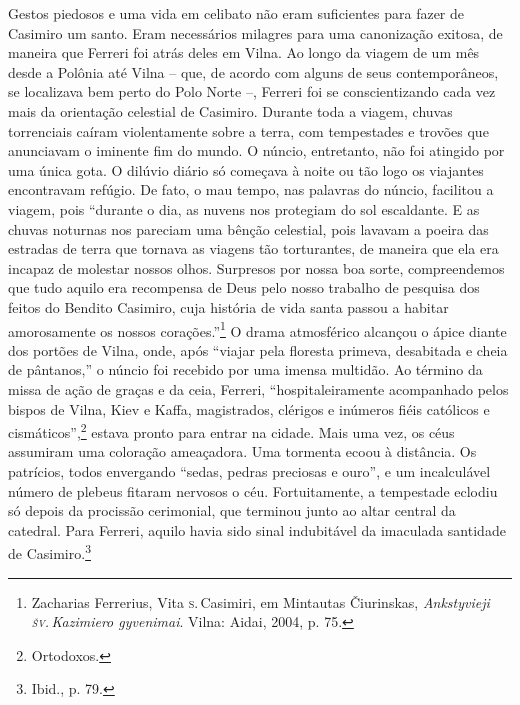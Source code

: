 Gestos piedosos e uma vida em celibato não eram suficientes para fazer
de Casimiro um santo. Eram necessários milagres para uma canonização
exitosa, de maneira que Ferreri foi atrás deles em Vilna. Ao longo da 
viagem de um mês desde a Polônia até Vilna -- que, de acordo com
alguns de seus contemporâneos, se localizava bem perto do Polo Norte --,
Ferreri foi se conscientizando cada vez mais da orientação celestial de
Casimiro. Durante toda a viagem, chuvas torrenciais caíram violentamente
sobre a terra, com tempestades e trovões que anunciavam o iminente fim
do mundo. O núncio, entretanto, não foi atingido por uma única gota. O
dilúvio diário só começava à noite ou tão logo os viajantes encontravam
refúgio. De fato, o mau tempo, nas palavras do núncio, facilitou a
viagem, pois ``durante o dia, as nuvens nos protegiam do sol escaldante.
E as chuvas noturnas nos pareciam uma bênção celestial, pois lavavam a
poeira das estradas de
terra que tornava as viagens tão torturantes, de maneira que ela era incapaz de molestar nossos olhos.
Surpresos por nossa boa sorte, compreendemos que tudo aquilo era
recompensa de Deus pelo nosso trabalho de pesquisa dos feitos do Bendito
Casimiro, cuja história de vida santa passou a habitar amorosamente os
nossos corações.''\footnote{Zacharias Ferrerius, Vita \textsc{s}.\,Casimiri, em Mintautas Čiurinskas, \textit{Ankstyvieji \textsc{šv}.\,Kazimiero gyvenimai}. Vilna: Aidai, 2004, p. 75.}
O drama atmosférico alcançou o ápice diante dos portões de Vilna, onde,
após ``viajar pela floresta primeva, desabitada e cheia de pântanos,'' o
núncio foi recebido por uma imensa multidão. Ao término da missa de ação
de graças e da ceia, Ferreri, ``hospitaleiramente acompanhado pelos
bispos de Vilna, Kiev e Kaffa, magistrados, clérigos e inúmeros fiéis
católicos e cismáticos'',\footnote{Ortodoxos.} estava pronto para entrar na
cidade. Mais uma vez, os céus assumiram uma coloração ameaçadora. Uma
tormenta ecoou à distância. Os patrícios, todos envergando ``sedas,
pedras preciosas e ouro'', e um incalculável número de plebeus fitaram
nervosos o céu. Fortuitamente, a tempestade eclodiu só depois da
procissão cerimonial, que terminou junto ao altar central da catedral.
Para Ferreri, aquilo havia sido sinal indubitável da imaculada santidade
de Casimiro.\footnote{Ibid., p. 79.}

